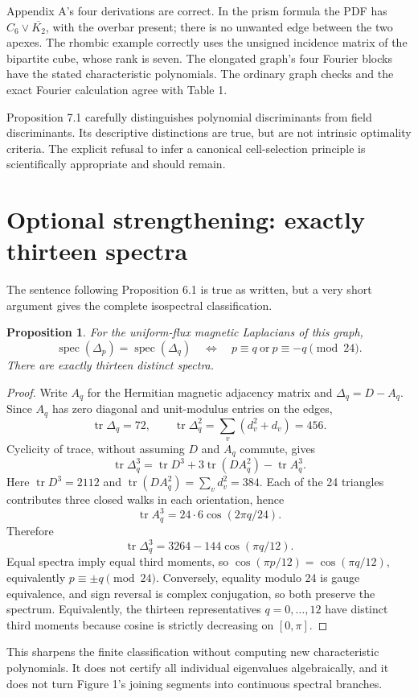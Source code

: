 \documentclass[11pt,a4paper]{article}
\newcommand{\tr}{\operatorname{tr}}
\newcommand{\spec}{\operatorname{spec}}
\newtheorem{proposition}{Proposition}
\begin{document}
Appendix A's four derivations are correct. In the prism formula the PDF has $C_6\vee\overline{K_2}$, with the overbar present; there is no unwanted edge between the two apexes. The rhombic example correctly uses the unsigned incidence matrix of the bipartite cube, whose rank is seven. The elongated graph's four Fourier blocks have the stated characteristic polynomials. The ordinary graph checks and the exact Fourier calculation agree with Table 1.

Proposition 7.1 carefully distinguishes polynomial discriminants from field discriminants. Its descriptive distinctions are true, but are not intrinsic optimality criteria. The explicit refusal to infer a canonical cell-selection principle is scientifically appropriate and should remain.

\section{Optional strengthening: exactly thirteen spectra}\label{sec:moment}
The sentence following Proposition 6.1 is true as written, but a very short argument gives the complete isospectral classification.

\begin{proposition}
For the uniform-flux magnetic Laplacians of this graph,
\[
\spec(\Delta_p)=\spec(\Delta_q)
\quad\Longleftrightarrow\quad p\equiv q\ \text{or}\ p\equiv-q\pmod{24}.
\]
There are exactly thirteen distinct spectra.
\end{proposition}
\begin{proof}
Write $A_q$ for the Hermitian magnetic adjacency matrix and $\Delta_q=D-A_q$. Since $A_q$ has zero diagonal and unit-modulus entries on the edges,
\[
\tr\Delta_q=72,\qquad \tr\Delta_q^2=\sum_v(d_v^2+d_v)=456.
\]
Cyclicity of trace, without assuming $D$ and $A_q$ commute, gives
\[
\tr\Delta_q^3=\tr D^3+3\tr(DA_q^2)-\tr A_q^3.
\]
Here $\tr D^3=2112$ and $\tr(DA_q^2)=\sum_vd_v^2=384$. Each of the 24 triangles contributes three closed walks in each orientation, hence
\[
\tr A_q^3=24\cdot6\cos(2\pi q/24).
\]
Therefore
\begin{equation}\label{eq:moment}
\boxed{\tr\Delta_q^3=3264-144\cos(\pi q/12).}
\end{equation}
Equal spectra imply equal third moments, so $\cos(\pi p/12)=\cos(\pi q/12)$, equivalently $p\equiv\pm q\pmod{24}$. Conversely, equality modulo 24 is gauge equivalence, and sign reversal is complex conjugation, so both preserve the spectrum. Equivalently, the thirteen representatives $q=0,\ldots,12$ have distinct third moments because cosine is strictly decreasing on $[0,\pi]$.
\end{proof}
This sharpens the finite classification without computing new characteristic polynomials. It does not certify all individual eigenvalues algebraically, and it does not turn Figure 1's joining segments into continuous spectral branches.
\end{document}
